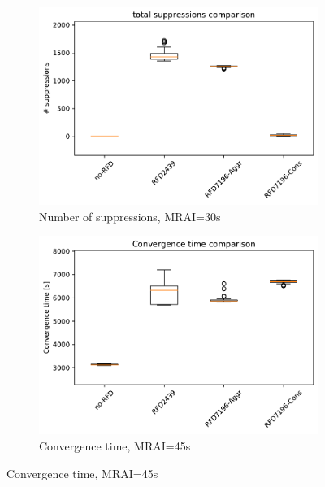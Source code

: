 \begin{figure}[H]
     \hfill
     \begin{subfigure}[b]{0.325\textwidth}
         \centering
         \includegraphics[width=\textwidth]{images/RFD/miceVSelephants/MultiMRAI/30/mice/cisco_1000MRAI30_rfd_comparison_suppressions_boxplot.pdf}
         \caption{\scriptsize Number of suppressions, MRAI=30s}
         \label{fig:1000_RFD_MRAI30_suppressions_mice}
     \end{subfigure}
     \vfill
     \begin{subfigure}[b]{0.325\textwidth}
         \centering
         \includegraphics[width=\textwidth]{images/RFD/miceVSelephants/MultiMRAI/45/mice/cisco_1000MRAI45_rfd_comparison_time_boxplot.pdf}
         \caption{\scriptsize Convergence time, MRAI=45s}
         \label{fig:1000_RFD_MRAI45_time_mice}
     \end{subfigure}

\end{figure}
